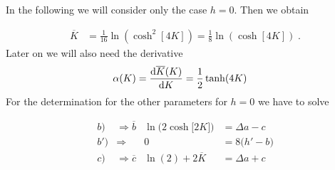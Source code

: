 %
In the following we will consider only the case $h=0$. Then we obtain  

%
\begin{align}\label{eq:ol:K}
\overline K &= \frac{1}{16}\ln(\cosh^{2}[4 K])
= \frac{1}{8}\ln(\cosh[4 K])\;.
\end{align}
%
Later on we will also need the derivative
%
\begin{align}\label{eq:der:ul:K}
\alpha(K) &= \dv{\overline K(K)}{K} =\frac{1}{2} \tanh(4 K)
\end{align}
%
For the determination for the other parameters for $h=0$ we have to solve

%
\begin{align*}
b)&\Rightarrow \overline{b}& \ln\bigg(2\cosh\big[2 K\big] \bigg) &=
\Delta a -c \tag{$\overline b$}\\
b')&\Rightarrow&0&= 8\big(h' -b \big)\tag{$\overline b'$}\\
c)&\Rightarrow\overline{c}& \ln(2) + 2 \overline K &=\Delta a +c   \tag{$\overline c$}
\end{align*}
%


